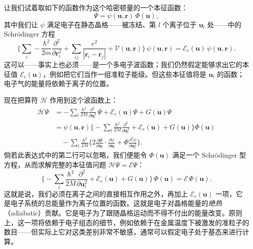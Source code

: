 让我们试着取如下的函数作为这个哈密顿量的一个本征函数：
\begin{equation*}
\Psi = \psi(\mathbf{u},\mathbf{r})\,\Phi(\mathbf{u}), \tag{6.73}
\end{equation*}
其中我们让 $\psi$ 满足电子在静态晶格——被冻结、第 $l$ 个离子位于 $\mathbf{u}_l$ 处——中的 Schr\"odinger 方程
\begin{equation*}
\biggl\{\sum_{i}-\frac{\hbar^{2}}{2m}\frac{\partial^{2}}{\partial\mathbf{r}_{i}^{2}} + \sum_{ij}\frac{e^{2}}{|\mathbf{r}_{i}-\mathbf{r}_{j}|} + \mathcal{V}(\mathbf{u},\mathbf{r})\biggr\}\,\psi(\mathbf{u},\mathbf{r}) = \mathcal{E}_{e}(\mathbf{u})\,\psi(\mathbf{u},\mathbf{r}). \tag{6.74}
\end{equation*}
这可以——事实上也必须——是一个多电子波函数；我们仍然假定能够求出它的本征值 $\mathcal{E}_{e}(\mathbf{u})$，例如把它们当作一组准粒子能级。但这些本征值将是 $\mathbf{u}_l$ 的函数；电子气的能量将依赖于离子的位置。

现在把算符 $\mathcal{H}$ 作用到这个波函数上：
\begin{align*}
\mathcal{H}\Psi &= -\sum_{l}\frac{\hbar^{2}}{2M}\frac{\partial^{2}}{\partial\mathbf{u}_{l}^{2}}\,\Psi + \mathcal{E}_{e}(\mathbf{u})\Psi + G(\mathbf{u})\Psi \\
&= \psi(\mathbf{u},\mathbf{r})\biggl\{-\sum_{l}\frac{\hbar^{2}}{2M}\frac{\partial^{2}}{\partial\mathbf{u}_{l}^{2}} + \mathcal{E}_{e}(\mathbf{u}) + G(\mathbf{u})\biggr\}\Phi(\mathbf{u}) \\
&\quad -\sum_{l}\frac{\hbar^{2}}{2M}\biggl\{2\frac{\partial\Phi}{\partial\mathbf{u}_{l}}\cdot\frac{\partial\psi}{\partial\mathbf{u}_{l}} + \Phi\frac{\partial^{2}\psi}{\partial\mathbf{u}_{l}^{2}}\biggr\}. \tag{6.75}
\end{align*}
倘若此表达式中的第二行可以忽略，我们便能令 $\Phi(\mathbf{u})$ 满足一个 Schr\"odinger 型方程，从而求解完整的本征值问题 $\mathcal{H}\Psi = \mathcal{E}\Psi$：
\begin{equation*}
\biggl\{-\sum_{l}\frac{\hbar^{2}}{2M}\frac{\partial^{2}}{\partial\mathbf{u}_{l}^{2}} + \mathcal{E}_{e}(\mathbf{u}) + G(\mathbf{u})\biggr\}\,\Phi(\mathbf{u}) = \mathcal{E}\,\Phi(\mathbf{u}). \tag{6.76}
\end{equation*}
这就是说，我们必须在离子之间的直接相互作用之外，再加上 $\mathcal{E}_{e}(\mathbf{u})$ 一项，它是电子系统的总能量作为离子位置的函数。这就是电子对晶格能量的\emph{绝热}（adiabatic）贡献。它是电子为了跟随晶格运动而不得不付出的能量改变。原则上，这一项将依赖于电子组态的细节，例如依赖于在金属温度下被激发的准粒子的数目——但实际上它对这类差别非常不敏感，通常可以假定电子处于基态来进行计算。


